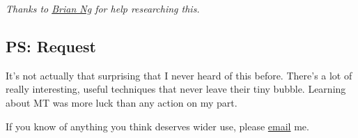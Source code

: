 \emph{Thanks to \href{https://twitter.com/sindarknave}{Brian Ng} for
help researching this.}

\subsection{PS: Request}
\label{ps-request}

It's not actually that surprising that I never heard of this before.
There's a lot of really interesting, useful techniques that never leave
their tiny bubble. Learning about MT was more luck than any action on my
part.

If you know of anything you think deserves wider use, please
\href{mailto:h@hillelwayne.com}{email} me.
